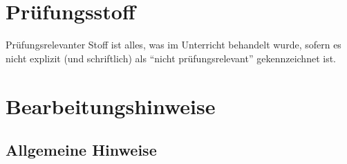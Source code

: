 \documentclass[
  a4paper,
  DIV=11]{scrreprt}
\theoremstyle{definition}
\theoremstyle{remark}
\begin{document}
\hypertarget{pruxfcfungsstoff}{%
\section{Prüfungsstoff}\label{pruxfcfungsstoff}}

Prüfungsrelevanter Stoff ist alles, was im Unterricht behandelt wurde,
sofern es nicht explizit (und schriftlich) als ``nicht
prüfungsrelevant'' gekennzeichnet ist.

\hypertarget{bearbeitungshinweise}{%
\section{Bearbeitungshinweise}\label{bearbeitungshinweise}}

\hypertarget{allgemeine-hinweise}{%
\subsection{Allgemeine Hinweise}\label{allgemeine-hinweise}}
\end{document}
